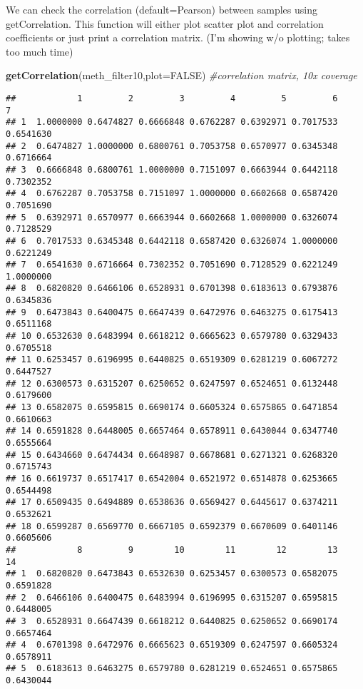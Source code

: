 \documentclass[]{article}
\newenvironment{Shaded}{\begin{snugshade}}{\end{snugshade}}
\newcommand{\KeywordTok}[1]{\textcolor[rgb]{0.13,0.29,0.53}{\textbf{#1}}}
\newcommand{\DataTypeTok}[1]{\textcolor[rgb]{0.13,0.29,0.53}{#1}}
\newcommand{\CommentTok}[1]{\textcolor[rgb]{0.56,0.35,0.01}{\textit{#1}}}
\newcommand{\OtherTok}[1]{\textcolor[rgb]{0.56,0.35,0.01}{#1}}
\newcommand{\NormalTok}[1]{#1}
\begin{document}
We can check the correlation (default=Pearson) between samples using
getCorrelation. This function will either plot scatter plot and
correlation coefficients or just print a correlation matrix. (I'm
showing w/o plotting; takes too much time)

\begin{Shaded}
\begin{Highlighting}[]
\KeywordTok{getCorrelation}\NormalTok{(meth_filter10,}\DataTypeTok{plot=}\OtherTok{FALSE}\NormalTok{) }\CommentTok{#correlation matrix, 10x coverage}
\end{Highlighting}
\end{Shaded}

\begin{verbatim}
##            1         2         3         4         5         6         7
## 1  1.0000000 0.6474827 0.6666848 0.6762287 0.6392971 0.7017533 0.6541630
## 2  0.6474827 1.0000000 0.6800761 0.7053758 0.6570977 0.6345348 0.6716664
## 3  0.6666848 0.6800761 1.0000000 0.7151097 0.6663944 0.6442118 0.7302352
## 4  0.6762287 0.7053758 0.7151097 1.0000000 0.6602668 0.6587420 0.7051690
## 5  0.6392971 0.6570977 0.6663944 0.6602668 1.0000000 0.6326074 0.7128529
## 6  0.7017533 0.6345348 0.6442118 0.6587420 0.6326074 1.0000000 0.6221249
## 7  0.6541630 0.6716664 0.7302352 0.7051690 0.7128529 0.6221249 1.0000000
## 8  0.6820820 0.6466106 0.6528931 0.6701398 0.6183613 0.6793876 0.6345836
## 9  0.6473843 0.6400475 0.6647439 0.6472976 0.6463275 0.6175413 0.6511168
## 10 0.6532630 0.6483994 0.6618212 0.6665623 0.6579780 0.6329433 0.6705518
## 11 0.6253457 0.6196995 0.6440825 0.6519309 0.6281219 0.6067272 0.6447527
## 12 0.6300573 0.6315207 0.6250652 0.6247597 0.6524651 0.6132448 0.6179600
## 13 0.6582075 0.6595815 0.6690174 0.6605324 0.6575865 0.6471854 0.6610663
## 14 0.6591828 0.6448005 0.6657464 0.6578911 0.6430044 0.6347740 0.6555664
## 15 0.6434660 0.6474434 0.6648987 0.6678681 0.6271321 0.6268320 0.6715743
## 16 0.6619737 0.6517417 0.6542004 0.6521972 0.6514878 0.6253665 0.6544498
## 17 0.6509435 0.6494889 0.6538636 0.6569427 0.6445617 0.6374211 0.6532621
## 18 0.6599287 0.6569770 0.6667105 0.6592379 0.6670609 0.6401146 0.6605606
##            8         9        10        11        12        13        14
## 1  0.6820820 0.6473843 0.6532630 0.6253457 0.6300573 0.6582075 0.6591828
## 2  0.6466106 0.6400475 0.6483994 0.6196995 0.6315207 0.6595815 0.6448005
## 3  0.6528931 0.6647439 0.6618212 0.6440825 0.6250652 0.6690174 0.6657464
## 4  0.6701398 0.6472976 0.6665623 0.6519309 0.6247597 0.6605324 0.6578911
## 5  0.6183613 0.6463275 0.6579780 0.6281219 0.6524651 0.6575865 0.6430044

\end{verbatim}
\end{document}
